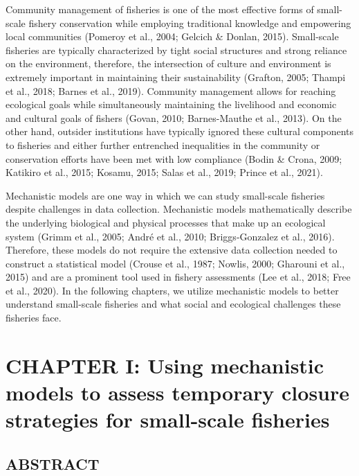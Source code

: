 \documentclass[
]{article}
\begin{document}
Community management of fisheries is one of the most effective forms of small-scale fishery conservation while employing traditional knowledge and empowering local communities (Pomeroy et al., 2004; Gelcich \& Donlan, 2015). Small-scale fisheries are typically characterized by tight social structures and strong reliance on the environment, therefore, the intersection of culture and environment is extremely important in maintaining their sustainability (Grafton, 2005; Thampi et al., 2018; Barnes et al., 2019). Community management allows for reaching ecological goals while simultaneously maintaining the livelihood and economic and cultural goals of fishers (Govan, 2010; Barnes-Mauthe et al., 2013). On the other hand, outsider institutions have typically ignored these cultural components to fisheries and either further entrenched inequalities in the community or conservation efforts have been met with low compliance (Bodin \& Crona, 2009; Katikiro et al., 2015; Kosamu, 2015; Salas et al., 2019; Prince et al., 2021).

Mechanistic models are one way in which we can study small-scale fisheries despite challenges in data collection. Mechanistic models mathematically describe the underlying biological and physical processes that make up an ecological system (Grimm et al., 2005; André et al., 2010; Briggs-Gonzalez et al., 2016). Therefore, these models do not require the extensive data collection needed to construct a statistical model (Crouse et al., 1987; Nowlis, 2000; Gharouni et al., 2015) and are a prominent tool used in fishery assessments (Lee et al., 2018; Free et al., 2020). In the following chapters, we utilize mechanistic models to better understand small-scale fisheries and what social and ecological challenges these fisheries face.

\newpage

\hypertarget{chapter-i-using-mechanistic-models-to-assess-temporary-closure-strategies-for-small-scale-fisheries}{%
\section{CHAPTER I: Using mechanistic models to assess temporary closure strategies for small-scale fisheries}\label{chapter-i-using-mechanistic-models-to-assess-temporary-closure-strategies-for-small-scale-fisheries}}

\hypertarget{abstract-1}{%
\subsection{ABSTRACT}\label{abstract-1}}
\end{document}
